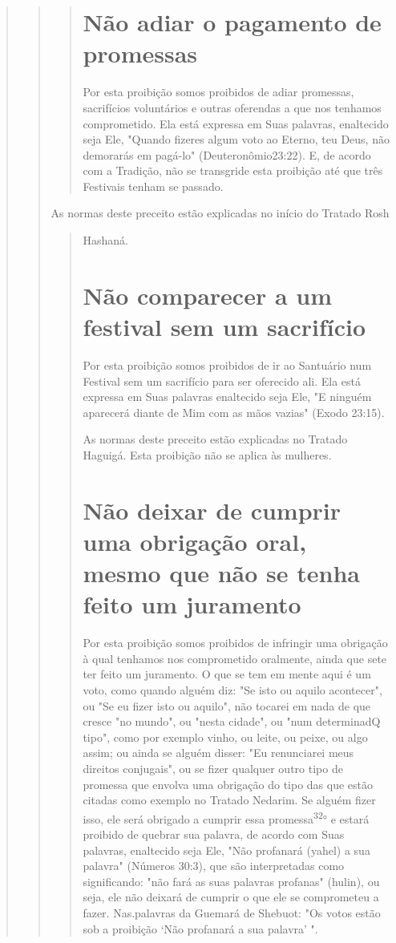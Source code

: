\begin{quote}
\begin{quote}
\begin{quote}
\section{Não adiar o pagamento de promessas}

Por esta proibição somos proibidos de adiar promessas, sacrifícios
voluntários e outras oferendas a que nos tenhamos comprometido. Ela está
ex­pressa em Suas palavras, enaltecido seja Ele, "Quando fizeres algum
voto ao Eterno, teu Deus, não demorarás em pagá-lo" (Deuteronômio23:22).
E, de acor­do com a Tradição, não se transgride esta proibição até que
três Festivais te­nham se passado.
\end{quote}

As normas deste preceito estão explicadas no início do Tratado Rosh

\begin{quote}
Hashaná.

\section{Não comparecer a um festival sem um sacrifício}

Por esta proibição somos proibidos de ir ao Santuário num Festival sem
um sacrifício para ser oferecido ali. Ela está expressa em Suas palavras
enal­tecido seja Ele, "E ninguém aparecerá diante de Mim com as mãos
vazias" (Exodo 23:15).

As normas deste preceito estão explicadas no Tratado Haguigá. Esta
proibição não se aplica às mulheres.

\section{Não deixar de cumprir uma obrigação oral, mesmo que não se tenha 
feito um juramento}

Por esta proibição somos proibidos de infringir uma obrigação à qual
tenhamos nos comprometido oralmente, ainda que sete ter feito um
juramen­to. O que se tem em mente aqui é um voto, como quando alguém
diz: "Se isto ou aquilo acontecer", ou "Se eu fizer isto ou aquilo", não
tocarei em nada de que cresce "no mundo", ou "nesta cidade", ou "num
determinadQ tipo", como
por exemplo vinho, ou leite, ou peixe, ou algo assim; ou ainda se alguém
dis­ser: "Eu renunciarei meus direitos conjugais", ou se fizer qualquer
outro tipo de promessa que envolva uma obrigação do tipo das que estão
citadas como exemplo no Tratado Nedarim. Se alguém fizer isso, ele será
obrigado a cumprir essa promessa\textsuperscript{32}° e estará proibido
de quebrar sua palavra, de acordo com Suas palavras, enaltecido seja
Ele, "Não profanará (yahel) a sua palavra" (Números 30:3), que são
interpretadas como significando: "não fará as suas palavras pro­fanas"
(hulin), ou seja, ele não deixará de cumprir o que ele se comprometeu a
fazer. Nas.palavras da Guemará de Shebuot: "Os votos
estão sob a proibição `Não profanará a sua palavra' ".


\end{quote}
\end{quote}
\end{quote}
